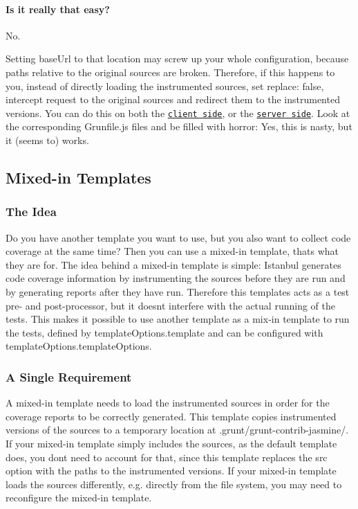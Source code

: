 \paragraph*{Is it really that easy?}

No.

Setting {\ttfamily base\+Url} to that location may screw up your whole configuration, because paths relative to the original sources are broken. Therefore, if this happens to you, instead of directly loading the instrumented sources, set {\ttfamily replace\+: false}, intercept request to the original sources and redirect them to the instrumented versions. You can do this on both the \href{https://github.com/maenu/grunt-template-jasmine-istanbul-example/tree/requirejs-client}{\tt client side}, or the \href{https://github.com/maenu/grunt-template-jasmine-istanbul-example/tree/requirejs-server}{\tt server side}. Look at the corresponding {\ttfamily Grunfile.\+js} files and be filled with horror\+: Yes, this is nasty, but it (seems to) works.

\subsection*{Mixed-\/in Templates}

\subsubsection*{The Idea}

Do you have another template you want to use, but you also want to collect code coverage at the same time? Then you can use a mixed-\/in template, that\textquotesingle{}s what they are for. The idea behind a mixed-\/in template is simple\+: Istanbul generates code coverage information by instrumenting the sources before they are run and by generating reports after they have run. Therefore this templates acts as a test pre-\/ and post-\/processor, but it doesn\textquotesingle{}t interfere with the actual running of the tests. This makes it possible to use another template as a mix-\/in template to run the tests, defined by {\ttfamily template\+Options.\+template} and can be configured with {\ttfamily template\+Options.\+template\+Options}.

\subsubsection*{A Single Requirement}

A mixed-\/in template needs to load the instrumented sources in order for the coverage reports to be correctly generated. This template copies instrumented versions of the sources to a temporary location at {\ttfamily .grunt/grunt-\/contrib-\/jasmine/}. If your mixed-\/in template simply includes the sources, as the default template does, you don\textquotesingle{}t need to account for that, since this template replaces the {\ttfamily src} option with the paths to the instrumented versions. If your mixed-\/in template loads the sources differently, e.\+g. directly from the file system, you may need to reconfigure the mixed-\/in template.

